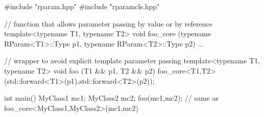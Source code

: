 \begin{cpp}
#include "rparam.hpp"
#include "rparamcls.hpp"

// function that allows parameter passing by value or by reference
template<typename T1, typename T2>
void foo_core (typename RParam<T1>::Type p1,
				typename RParam<T2>::Type p2)
{
	...
}

// wrapper to avoid explicit template parameter passing
template<typename T1, typename T2>
void foo (T1 && p1, T2 && p2)
{
	foo_core<T1,T2>(std::forward<T1>(p1),std::forward<T2>(p2));
}

int main()
{
	MyClass1 mc1;
	MyClass2 mc2;
	foo(mc1,mc2); // same as foo_core<MyClass1,MyClass2>(mc1,mc2)
}
\end{cpp}











